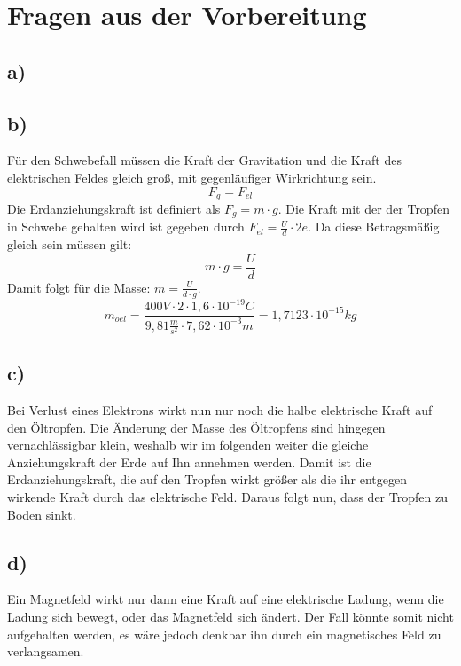 \section*{Fragen aus der Vorbereitung}
\subsection*{a)}
\subsection*{b)}
Für den Schwebefall müssen die Kraft der Gravitation und die Kraft des elektrischen Feldes gleich groß, mit gegenläufiger Wirkrichtung sein.
\[F_g = F_{el}\]
Die Erdanziehungskraft ist definiert als $F_g = m \cdot g$. Die Kraft mit der der Tropfen in Schwebe gehalten wird ist gegeben durch $F_{el} = \frac{U}{d} \cdot 2e$. Da diese Betragsmäßig gleich sein müssen gilt:
\[m \cdot g  = \frac{U}{d}\]
Damit folgt für die Masse: $m = \frac{U}{d \cdot g}$.
\[m_{oel} = \frac{400V \cdot 2 \cdot 1,6 \cdot 10^{-19}C}{9,81\frac{m}{s^2} \cdot 7,62 \cdot 10^{-3}m} = 1,7123\cdot10^{-15}kg\]
\subsection*{c)}
Bei Verlust eines Elektrons wirkt nun nur noch die halbe elektrische Kraft auf den Öltropfen. Die Änderung der Masse des Öltropfens sind hingegen vernachlässigbar klein, weshalb wir im folgenden weiter die gleiche Anziehungskraft der Erde auf Ihn annehmen werden. Damit ist die Erdanziehungskraft, die auf den Tropfen wirkt größer als die ihr entgegen wirkende Kraft durch das elektrische Feld. Daraus folgt nun, dass der Tropfen zu Boden sinkt.
\subsection*{d)}
Ein Magnetfeld wirkt nur dann eine Kraft auf eine elektrische Ladung, wenn die Ladung sich bewegt, oder das Magnetfeld sich ändert. Der Fall könnte somit nicht aufgehalten werden, es wäre jedoch denkbar ihn durch ein magnetisches Feld zu verlangsamen.